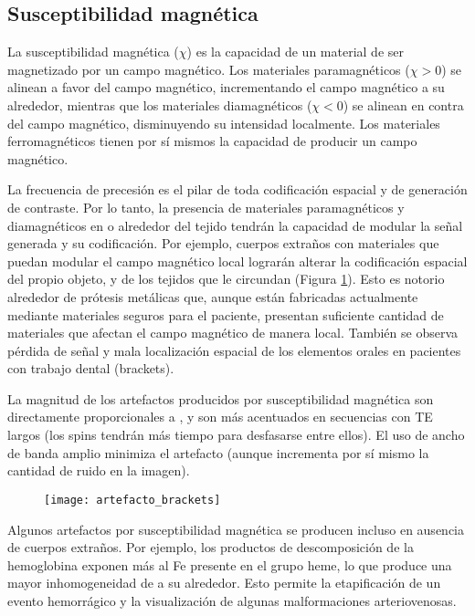 \subsection{Susceptibilidad magnética}
La susceptibilidad magnética ($\chi$) es la capacidad de un material de ser magnetizado por un campo magnético. Los materiales paramagnéticos ($\chi>0$) se alinean a favor del campo magnético, incrementando el campo magnético a su alrededor, mientras que los materiales diamagnéticos ($\chi<0$) se alinean en contra del campo magnético, disminuyendo su intensidad localmente. Los materiales ferromagnéticos tienen por sí mismos la capacidad de producir un campo magnético.

La frecuencia de precesión es el pilar de toda codificación espacial y de generación de contraste. Por lo tanto, la presencia de materiales paramagnéticos y diamagnéticos en o alrededor del tejido tendrán la capacidad de modular la señal generada y su codificación. Por ejemplo, cuerpos extraños con materiales que puedan modular el campo magnético local lograrán alterar la codificación espacial del propio objeto, y de los tejidos que le circundan (Figura \ref{fig:artefacto_brackets}). Esto es notorio alrededor de prótesis metálicas que, aunque están fabricadas actualmente mediante materiales seguros para el paciente, presentan suficiente cantidad de materiales que afectan el campo magnético de manera local. También se observa pérdida de señal y mala localización espacial de los elementos orales en pacientes con trabajo dental (brackets). 

La magnitud de los artefactos producidos por susceptibilidad magnética son directamente proporcionales a \Bzero, y son más acentuados en secuencias con TE largos (los spins tendrán más tiempo para desfasarse entre ellos). El uso de ancho de banda amplio minimiza el artefacto (aunque incrementa por sí mismo la cantidad de ruido en la imagen).


\begin{figure}[htb]
 \begin{figg}
   \texttt{[image: artefacto\_brackets]}
   \caption{\figurapendiente}
 \label{fig:artefacto_brackets}
 \end{figg}
\end{figure}


Algunos artefactos por susceptibilidad magnética se producen incluso en ausencia de cuerpos extraños. Por ejemplo, los productos de descomposición de la hemoglobina exponen más al Fe presente en el grupo heme, lo que produce una mayor inhomogeneidad de \Bzero a su alrededor. Esto permite la etapificación de un evento hemorrágico y la visualización de algunas malformaciones arteriovenosas. 

